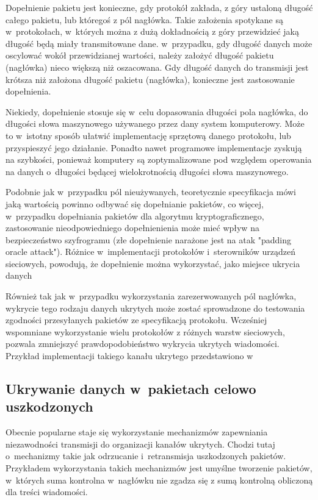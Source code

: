 \documentclass[a4paper, twoside, 12pt]{report}
\begin{document}
        Dopełnienie pakietu jest konieczne, gdy protokół zakłada, z góry ustaloną długość
        całego pakietu, lub któregoś z pól nagłówka. Takie założenia spotykane są
        w~protokołach, w~których można z dużą dokładnością z góry przewidzieć jaką długość
        będą miały transmitowane dane. w~przypadku, gdy długość danych może oscylować
        wokół przewidzianej wartości, należy założyć długość pakietu (nagłówka)
        nieco większą niż oszacowana. Gdy długość danych do transmisji jest krótsza niż
        założona długość pakietu (nagłówka), konieczne jest zastosowanie dopełnienia.

        Niekiedy, dopełnienie stosuje się w~celu dopasowania długości pola nagłówka,
        do długości słowa maszynowego używanego przez dany system komputerowy. Może
        to w~istotny sposób ułatwić implementację sprzętową danego protokołu, lub
        przyspieszyć jego działanie. Ponadto nawet programowe implementacje zyskują
        na szybkości, ponieważ komputery są zoptymalizowane pod względem operowania
        na danych o~długości będącej wielokrotnością długości słowa maszynowego.

        Podobnie jak w~przypadku pól nieużywanych, teoretycznie specyfikacja
        mówi jaką wartością powinno odbywać się dopełnianie pakietów, co więcej,
        w~przypadku dopełniania pakietów dla algorytmu kryptograficznego, zastosowanie
        nieodpowiedniego dopełnienienia może mieć wpływ na bezpieczeństwo szyfrogramu (złe dopełnienie narażone
        jest na atak "padding oracle attack"). Różnice w~implementacji protokołów
        i~sterowników urządzeń sieciowych, powodują, że dopełnienie można wykorzystać,
        jako miejsce ukrycia danych\cite{PADSTEG}

        Również tak jak w~przypadku wykorzystania zarezerwowanych pól nagłówka,
        wykrycie tego rodzaju danych ukrytych może zostać sprowadzone do testowania
        zgodności przesyłanych pakietów ze specyfikacją protokołu. Wcześniej wspomniane
        wykorzystanie wielu protokołów z różnych warstw sieciowych, pozwala zmniejszyć
        prawdopodobieństwo wykrycia ukrytych wiadomości. Przykład implementacji
        takiego kanału ukrytego przedstawiono w~\cite{PADSTEG}

        \subsection{Ukrywanie danych w~pakietach celowo uszkodzonych} \label{USZKODZONEPAKIETY}
        Obecnie popularne staje się wykorzystanie mechanizmów zapewniania niezawodności
        transmisji do organizacji kanałów ukrytych. Chodzi tutaj o~mechanizmy
        takie jak odrzucanie i~retransmisja uszkodzonych pakietów. Przykładem wykorzystania takich
        mechanizmów jest umyślne tworzenie pakietów, w~których suma kontrolna w~nagłówku
        nie zgadza się z sumą kontrolną obliczoną dla treści wiadomości.
\end{document}
